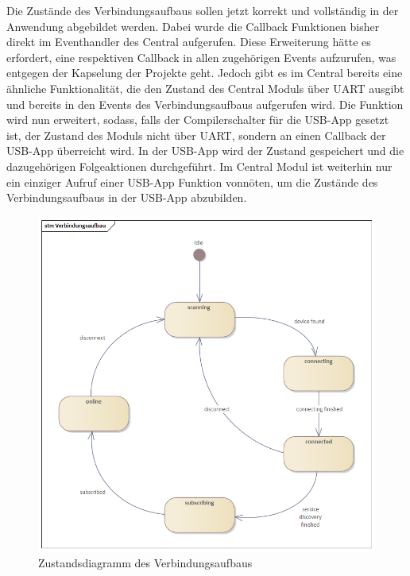 Die Zustände des Verbindungsaufbaus sollen jetzt korrekt und vollständig in der Anwendung abgebildet werden. Dabei wurde die Callback Funktionen bisher direkt im Eventhandler des Central aufgerufen. Diese Erweiterung hätte es erfordert, eine respektiven Callback in allen zugehörigen Events aufzurufen, was entgegen der Kapselung der Projekte geht. Jedoch gibt es im Central bereits eine ähnliche Funktionalität, die den Zustand des Central Moduls über \ac{UART} ausgibt und bereits in den Events des Verbindungsaufbaus aufgerufen wird. Die Funktion wird nun erweitert, sodass, falls der Compilerschalter für die \ac{USB}-App gesetzt ist, der Zustand des Moduls nicht über \ac{UART}, sondern an einen Callback der \ac{USB}-App überreicht wird. In der \ac{USB}-App wird der Zustand gespeichert und die dazugehörigen Folgeaktionen durchgeführt. Im Central Modul ist weiterhin nur ein einziger Aufruf einer \ac{USB}-App Funktion vonnöten, um die Zustände des Verbindungsaufbaus in der \ac{USB}-App abzubilden.

\begin{figure}[H] 
	\centering
	\includegraphics[width=\textwidth]{figures/Verbindungsaufbau.png}
	\caption{Zustandsdiagramm des Verbindungsaufbaus}
	\label{fig:ZustandsdiagrammVerbindungsaufbaus}
\end{figure}



